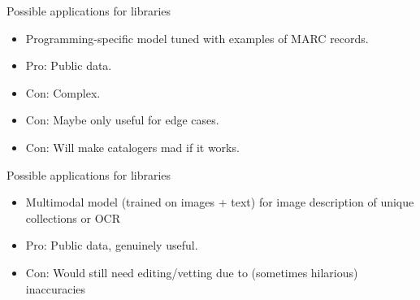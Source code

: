 \documentclass{beamer}
\begin{document}
\begin{frame}{Possible applications for libraries}
	\begin{itemize}
		\item Programming-specific model tuned with examples of MARC records.
		\pause
		\item Pro: Public data.
		\pause
		\item Con: Complex.
		\pause
		\item Con: Maybe only useful for edge cases.
		\pause
		\item Con: Will make catalogers mad if it works.
	\end{itemize}
\end{frame}

\begin{frame}{Possible applications for libraries}
	\begin{itemize}
		\item Multimodal model (trained on images + text) for image description of unique collections or OCR
		\pause
		\item Pro: Public data, genuinely useful.
		\pause
		\item Con: Would still need editing/vetting due to (sometimes hilarious) inaccuracies
		
	\end{itemize}
\end{frame}

\begin{frame}[plain]
\end{frame}

\begin{frame}[plain]
\end{frame}
\end{document}
